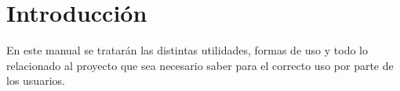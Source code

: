 \section{Introducción}

En este manual se tratarán las distintas utilidades, formas de uso y todo lo relacionado al proyecto que sea necesario saber para el correcto uso por parte de los usuarios.

